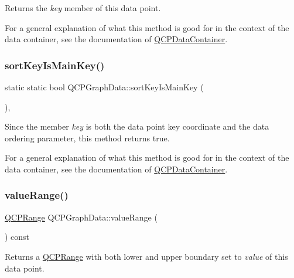 Returns the {\itshape key} member of this data point.

For a general explanation of what this method is good for in the context of the data container, see the documentation of \hyperlink{class_q_c_p_data_container}{Q\+C\+P\+Data\+Container}. \mbox{\label{class_q_c_p_graph_data_a1c98dfd21b82321a173db4ff860dfd21}} 
\subsubsection{\texorpdfstring{sort\+Key\+Is\+Main\+Key()}{sortKeyIsMainKey()}}
{\footnotesize\ttfamily static static bool Q\+C\+P\+Graph\+Data\+::sort\+Key\+Is\+Main\+Key (\begin{DoxyParamCaption}{ }\end{DoxyParamCaption})\hspace{0.3cm}{\ttfamily [inline]}, {\ttfamily [static]}}

Since the member {\itshape key} is both the data point key coordinate and the data ordering parameter, this method returns true.

For a general explanation of what this method is good for in the context of the data container, see the documentation of \hyperlink{class_q_c_p_data_container}{Q\+C\+P\+Data\+Container}. \mbox{\label{class_q_c_p_graph_data_a2f8dd30360356f66cc418a170a9f3792}} 
\subsubsection{\texorpdfstring{value\+Range()}{valueRange()}}
{\footnotesize\ttfamily \hyperlink{class_q_c_p_range}{Q\+C\+P\+Range} Q\+C\+P\+Graph\+Data\+::value\+Range (\begin{DoxyParamCaption}{ }\end{DoxyParamCaption}) const\hspace{0.3cm}{\ttfamily [inline]}}

Returns a \hyperlink{class_q_c_p_range}{Q\+C\+P\+Range} with both lower and upper boundary set to {\itshape value} of this data point.


